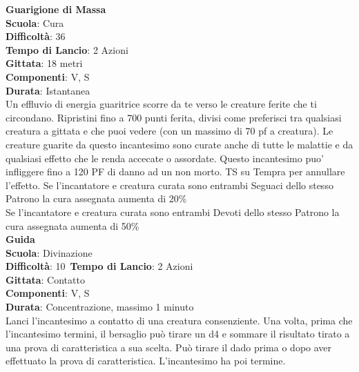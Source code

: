 \begin{multicols}{2}
\medskip\textbf{Guarigione di Massa}\\
\textbf{Scuola}: Cura\\
\textbf{Difficoltà}: 36\\
\textbf{Tempo di Lancio}: 2 Azioni\\
\textbf{Gittata}: 18 metri\\
\textbf{Componenti}: V, S\\
\textbf{Durata}: Istantanea\\
Un effluvio di energia guaritrice scorre da te verso le creature ferite che ti circondano. Ripristini fino a 700 punti ferita, divisi come preferisci tra qualsiasi creatura a gittata e che puoi vedere (con un massimo di 70 pf a creatura). Le creature guarite da questo incantesimo sono curate anche di tutte le malattie e da qualsiasi effetto che le renda accecate o assordate. Questo incantesimo puo' infliggere fino a 120 PF di danno ad un non morto. TS su Tempra per annullare l'effetto.
Se l'incantatore e creatura curata sono entrambi Seguaci dello stesso Patrono la cura assegnata aumenta di 20\%\\
Se l'incantatore e creatura curata sono entrambi Devoti dello stesso Patrono la cura assegnata aumenta di 50\%\\

\medskip\textbf{Guida}\\
\textbf{Scuola}: Divinazione\\
\textbf{Difficoltà}: 10\
\textbf{Tempo di Lancio}: 2 Azioni\\
\textbf{Gittata}: Contatto\\
\textbf{Componenti}: V, S\\
\textbf{Durata}: Concentrazione, massimo 1 minuto\\
Lanci l'incantesimo a contatto di una creatura consenziente. Una volta, prima che l'incantesimo termini, il bersaglio può tirare un d4 e sommare il risultato tirato a una prova di caratteristica a sua scelta. Può tirare il dado prima o dopo aver effettuato la prova di caratteristica. L'incantesimo ha poi termine. 


\end{multicols}
